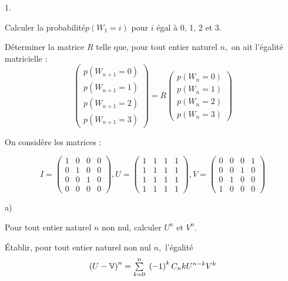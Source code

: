 \documentclass[11pt]{article}%
\begin{document}
\begin{noliste}{1.}
 \setlength{\itemsep}{4mm}
\item Calculer la probabilité$p(W_{1} = i)$ pour $i$ égal à 0, 1,
2 et 3.


\item Déterminer la matrice $R$ telle que, pour tout entier naturel
$n,$
on ait l'égalité matricielle : 
\[
\left( 
\begin{array}{l}
p\left( W_{n + 1} = 0\right) \\
p\left( W_{n + 1} = 1\right) \\
p\left( W_{n + 1} = 2\right) \\
p\left( W_{n + 1} = 3\right) 
\end{array}
\right) = R\left( 
\begin{array}{l}
p\left( W_{n} = 0\right) \\
p\left( W_{n} = 1\right) \\
p\left( W_{n} = 2\right) \\
p\left( W_{n} = 3\right) 
\end{array}
\right) 
\]


\item On considère les matrices :


\[
I = \left( 
\begin{array}{llll}
1 & 0 & 0 & 0 \\
0 & 1 & 0 & 0 \\
0 & 0 & 1 & 0 \\
0 & 0 & 0 & 0
\end{array}
\right),U = \left( 
\begin{array}{llll}
1 & 1 & 1 & 1 \\
1 & 1 & 1 & 1 \\
1 & 1 & 1 & 1 \\
1 & 1 & 1 & 1
\end{array}
\right),V = \left( 
\begin{array}{llll}
0 & 0 & 0 & 1 \\
0 & 0 & 1 & 0 \\
0 & 1 & 0 & 0 \\
1 & 0 & 0 & 0
\end{array}
\right) 
\]


\begin{noliste}{a)}
 \setlength{\itemsep}{2mm}
\item Pour tout entier naturel $n$ non nul, calculer $U^{n}$ et
$V^{n}.$


\item Établir, pour tout entier naturel non nul $n,$ l'égalité 
\[
\left( U-\mathbb{V}\right) ^{n} = {\textstyle\sum\limits_{k = 0}^{n}}\hspace{.1cm}\left( -1\right)
^{k}C_{n}{k}U^{n-k}V^{k}
\]



\end{noliste}
\end{noliste}
\end{document}
